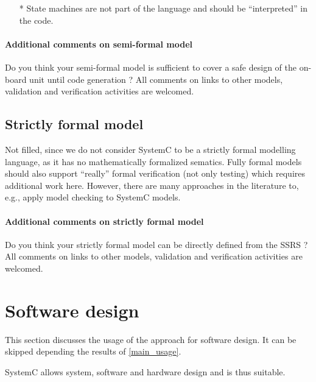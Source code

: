 \begin{assessor2}
  \begin{itemize}
  \item[*] State machines are not part of the language and should be
    ``interpreted'' in the code.
  \end{itemize}  
\end{assessor2}



\paragraph{Additional comments on semi-formal model} Do you think your semi-formal model is sufficient to cover a safe design of the on-board unit until code generation ?
All comments on links to other models, validation and verification activities are welcomed.

\subsection{Strictly formal model}

\begin{author_comment}
Not filled, since we do not consider SystemC to be a strictly formal modelling language, as it has no mathematically formalized sematics. Fully formal models should also support ``really'' formal verification (not only testing) which requires additional work here. However, there are many approaches in the literature to, e.g., apply model checking to SystemC models.
\end{author_comment}


\paragraph{Additional comments on strictly formal model} Do you think your strictly formal model can be directly defined from the SSRS ?
All comments on links to other models, validation and verification activities are welcomed.


\section{Software design}
This section discusses the usage of the approach for software design.
It can be skipped depending the results of \ref{main_usage}.

\begin{author_comment}
SystemC allows system, software and hardware design and is thus suitable.
\end{author_comment}

